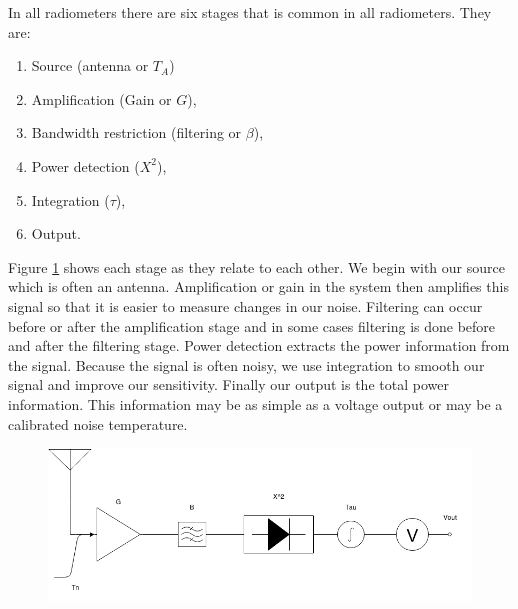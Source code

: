 
In all radiometers there are six stages that is common in all radiometers.  They are:

\begin{enumerate}
\item Source (antenna or $T_{A}$)
\item Amplification (Gain or $G$),
\item Bandwidth restriction (filtering or $\beta$),
\item Power detection ($X^{2}$),
\item Integration ($\tau$),
\item Output.
\end{enumerate}

Figure \ref{trad_radiometer} shows each stage as they relate to each other.  We begin with our source which is often an antenna.  Amplification or gain in the system then amplifies this signal so that it is easier to measure changes in our noise.  Filtering can occur before or after the amplification stage and in some cases filtering is done before and after the filtering stage.  Power detection extracts the power information from the signal.  Because the signal is often noisy, we use integration to smooth our signal and improve our sensitivity.  Finally our output is the total power information.  This information may be as simple as a voltage output or may be a calibrated noise temperature.

{\begin{figure}[h!tb] 
\centering
\includegraphics[width=\textwidth]{Images/Radiometer.png}
\label{trad_radiometer}
\end{figure}
}

